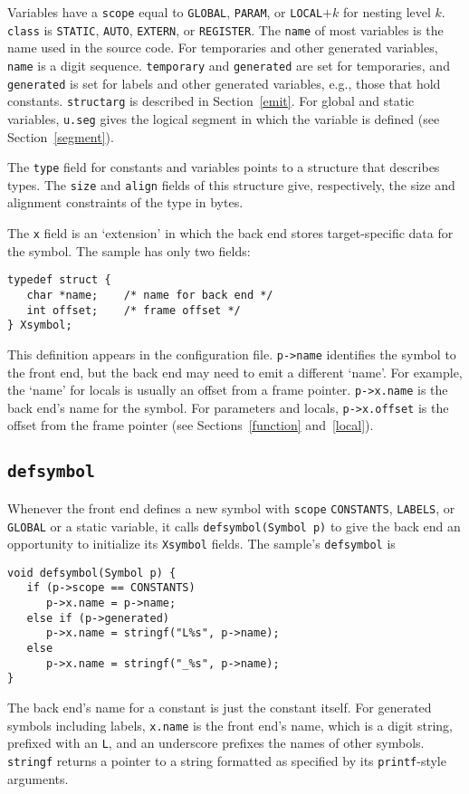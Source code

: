 Variables have a \verb|scope| equal to \verb|GLOBAL|, \verb|PARAM|,
or \verb|LOCAL|$+k$ for nesting level $k$.
\verb|class| is \verb|STATIC|, \verb|AUTO|, \verb|EXTERN|, or \verb|REGISTER|.
The \verb|name| of most variables is the name used in the source code.
For temporaries and other generated variables, \verb|name| is a digit sequence.
\verb|temporary| and \verb|generated| are set for temporaries,
and \verb|generated| is set for labels and other generated variables, e.g., those
that hold constants.
\verb|structarg| is described in Section~\ref{emit}.
For global and static variables,
\verb|u.seg| gives the logical segment in which the variable is defined
(see Section~\ref{segment}).

The \verb|type| field for constants and variables points to
a structure that describes types. The \verb|size| and \verb|align|
fields of this structure give, respectively, the size and alignment constraints
of the type in bytes.

The \verb|x| field is an `extension' in which the back end stores
target-specific data for the symbol.
The sample has only two fields:
\begin{verbatim}
typedef struct {
   char *name;    /* name for back end */
   int offset;    /* frame offset */
} Xsymbol;
\end{verbatim}
This definition appears in the configuration file.
\verb|p->name| identifies the symbol to the front end, but the back end
may need to emit a different `name'. For example,
the `name' for locals is usually an offset from a frame pointer.
\verb|p->x.name| is the back end's name for the symbol.
For parameters and locals, \verb|p->x.offset| is the
offset from the frame pointer (see Sections~\ref{function} and~\ref{local}).

\subsection{\tt defsymbol}

\label{defsymbol}
Whenever the front end defines a new symbol with
\verb|scope| \verb|CONSTANTS|, \verb|LABELS|, or \verb|GLOBAL|
or a static variable, it calls
\verb|defsymbol(Symbol p)| to give the back end an opportunity to initialize
its \verb|Xsymbol| fields. The sample's \verb|defsymbol| is
\begin{verbatim}
void defsymbol(Symbol p) {
   if (p->scope == CONSTANTS)
      p->x.name = p->name;
   else if (p->generated)
      p->x.name = stringf("L%s", p->name);
   else
      p->x.name = stringf("_%s", p->name);
}
\end{verbatim}
The back end's name for a constant is just the constant itself.
For generated symbols including labels, \verb|x.name| is the front end's name,
which is a digit string, prefixed with an \verb|L|,
and an underscore prefixes the names of other symbols.
\verb|stringf| returns a pointer to a string formatted as specified
by its \verb|printf|-style arguments.

